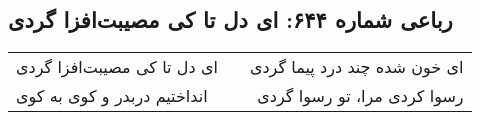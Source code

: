 \begin{center}
\section*{رباعی شماره ۶۴۴: ای دل تا کی مصیبت‌افزا گردی}
\label{sec:sh644}
\begin{longtable}{l p{0.5cm} r}
ای دل تا کی مصیبت‌افزا گردی
&&
ای خون شده چند درد پیما گردی
\\
انداختیم دربدر و کوی به کوی
&&
رسوا کردی مرا، تو رسوا گردی
\\
\end{longtable}
\end{center}
